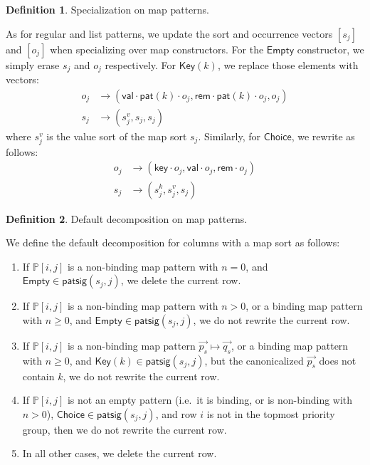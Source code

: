 \documentclass{article}
\theoremstyle{definition}
\newtheorem{definition}{Definition}[section]
\newcommand{\emptymap}{\mathsf{Empty}}
\newcommand{\mapkey}{\mathsf{Key}}
\newcommand{\mapchoice}{\mathsf{Choice}}
\newcommand{\PP}{\mathbb{P}}
\newcommand{\mapp}{\vec{p_s} \mapsto \vec{q_s}}
\newcommand{\rem}{\mathsf{rem}}
\newcommand{\val}{\mathsf{val}}
\newcommand{\key}{\mathsf{key}}
\newcommand{\pat}{\mathsf{pat}}
\newcommand{\patsig}{\mathsf{patsig}}
\begin{document}
\begin{definition}{Specialization on map patterns.}
\begin{enumerate}
\end{enumerate}

As for regular and list patterns, we update the sort and occurrence vectors $
[s_j] $ and $ [o_j] $ when specializing over map constructors. For the $
\emptymap $ constructor, we simply erase $ s_j $ and $ o_j $ respectively. For $
\mapkey(k) $, we replace those elements with vectors:
\begin{align*}
  o_j & \to (\val \cdot \pat(k) \cdot o_j, \rem \cdot \pat(k) \cdot o_j, o_j) \\
  s_j & \to (s^v_j, s_j, s_j)
\end{align*}
where $ s^v_j $ is the value sort of the map sort $ s_j $.
Similarly, for $ \mapchoice $, we rewrite as follows:
\begin{align*}
  o_j & \to (\key \cdot o_j, \val \cdot o_j, \rem \cdot o_j) \\
  s_j & \to (s^k_j, s^v_j, s_j)
\end{align*}

\end{definition}

\begin{definition}{Default decomposition on map patterns.}

We define the default decomposition for columns with a map sort as follows:

\begin{enumerate}

  \item If $ \PP[i, j] $ is a non-binding map pattern with $ n = 0 $, and $
    \emptymap \in \patsig(s_j, j) $, we delete the current row.

  \item If $ \PP[i, j] $ is a non-binding map pattern with $ n > 0 $, or a
    binding map pattern with $ n \geq 0 $, and $ \emptymap \in \patsig(s_j, j)
    $, we do not rewrite the current row.

  \item If $ \PP[i, j] $ is a non-binding map pattern $ \mapp $, or a binding
    map pattern with $ n \geq 0 $, and $ \mapkey(k) \in \patsig(s_j, j) $, but
    the canonicalized $ \vec{p_s} $ does not contain $ k $, we do not rewrite
    the current row.

  \item If $ \PP[i, j] $ is not an empty pattern (i.e.\ it is binding, or is
    non-binding with $ n > 0 $), $ \mapchoice \in \patsig(s_j, j) $, and row $ i
    $ is not in the topmost priority group, then we do not rewrite the current
    row.

  \item In all other cases, we delete the current row.

\end{enumerate}

\end{definition}
\end{document}
